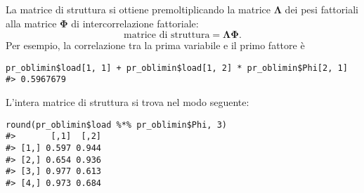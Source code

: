 La matrice di struttura si ottiene premoltiplicando la matrice $\boldsymbol{\Lambda}$ dei pesi fattoriali alla matrice  $\boldsymbol{\Phi}$ di intercorrelazione fattoriale:
$$
\text{matrice di struttura} = \boldsymbol{\Lambda}\boldsymbol{\Phi}.
$$
Per esempio, la correlazione tra la prima variabile e il primo
fattore è 
\begin{lstlisting}
pr_oblimin$load[1, 1] + pr_oblimin$load[1, 2] * pr_oblimin$Phi[2, 1]
#> 0.5967679 
\end{lstlisting}
L'intera matrice di struttura si trova nel modo seguente:
\begin{lstlisting}
round(pr_oblimin$load %*% pr_oblimin$Phi, 3)
#>       [,1]  [,2]
#> [1,] 0.597 0.944
#> [2,] 0.654 0.936
#> [3,] 0.977 0.613
#> [4,] 0.973 0.684
\end{lstlisting}







